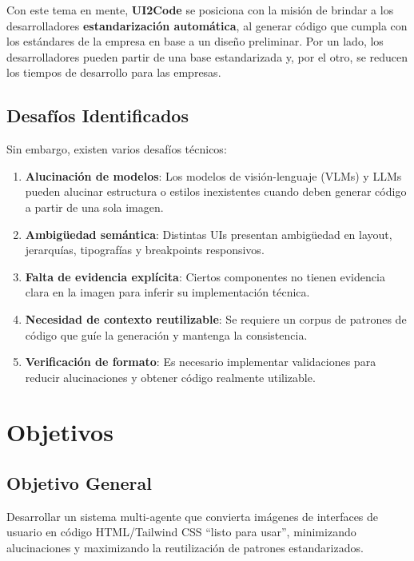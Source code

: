 \documentclass[12pt,a4paper]{article}
\begin{document}
Con este tema en mente, \textbf{UI2Code} se posiciona con la misión de brindar a los desarrolladores \textbf{estandarización automática}, al generar código que cumpla con los estándares de la empresa en base a un diseño preliminar. Por un lado, los desarrolladores pueden partir de una base estandarizada y, por el otro, se reducen los tiempos de desarrollo para las empresas.

\subsection{Desafíos Identificados}

Sin embargo, existen varios desafíos técnicos:

\begin{enumerate}
    \item \textbf{Alucinación de modelos}: Los modelos de visión-lenguaje (VLMs) y LLMs pueden alucinar estructura o estilos inexistentes cuando deben generar código a partir de una sola imagen.
    
    \item \textbf{Ambigüedad semántica}: Distintas UIs presentan ambigüedad en layout, jerarquías, tipografías y breakpoints responsivos.
    
    \item \textbf{Falta de evidencia explícita}: Ciertos componentes no tienen evidencia clara en la imagen para inferir su implementación técnica.
    
    \item \textbf{Necesidad de contexto reutilizable}: Se requiere un corpus de patrones de código que guíe la generación y mantenga la consistencia.
    
    \item \textbf{Verificación de formato}: Es necesario implementar validaciones para reducir alucinaciones y obtener código realmente utilizable.
\end{enumerate}

\section{Objetivos}

\subsection{Objetivo General}

Desarrollar un sistema multi-agente que convierta imágenes de interfaces de usuario en código HTML/Tailwind CSS ``listo para usar'', minimizando alucinaciones y maximizando la reutilización de patrones estandarizados.
\end{document}
